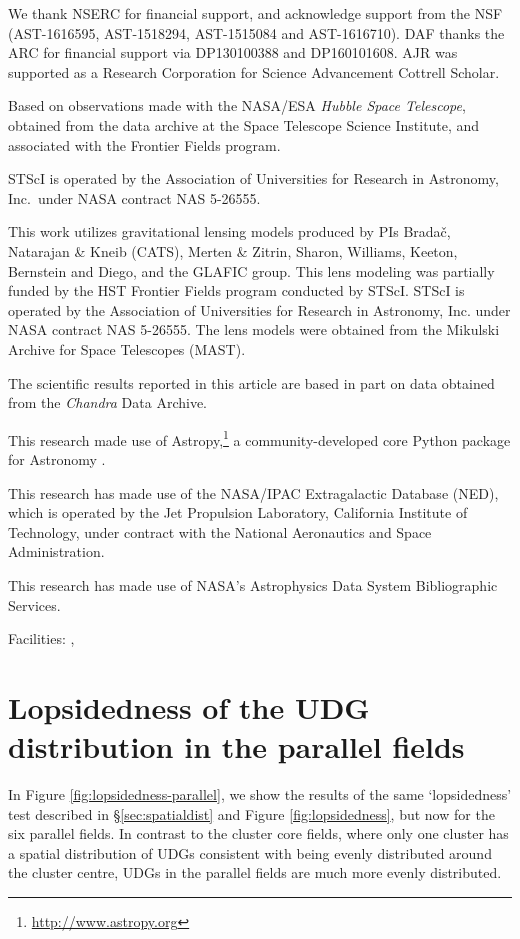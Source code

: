 \documentclass[iop,tighten,twocolumn,apj,floatfix]{emulateapj}
\begin{document}
\acknowledgements

We thank NSERC for financial support, and acknowledge support from the NSF
(AST-1616595, AST-1518294, AST-1515084 and AST-1616710).
DAF thanks the ARC for financial support via DP130100388 and DP160101608. 
AJR was supported as a Research Corporation for Science Advancement Cottrell Scholar.

Based on observations made with the NASA/ESA \textit{Hubble Space Telescope}, obtained
from the data archive at the Space Telescope Science Institute, and associated
with the Frontier Fields program.

STScI is operated by the Association of Universities for Research in
Astronomy, Inc.\ under NASA contract NAS 5-26555.

This work utilizes gravitational lensing models produced by PIs Bradač,
Natarajan \& Kneib (CATS), Merten \& Zitrin, Sharon, Williams, Keeton, Bernstein
and Diego, and the GLAFIC group. This lens modeling was partially funded by
the HST Frontier Fields program conducted by STScI. STScI is operated by the
Association of Universities for Research in Astronomy, Inc. under NASA
contract NAS 5-26555. The lens models were obtained from the Mikulski Archive
for Space Telescopes (MAST).

The scientific results reported in this article are based in part on data
obtained from the \textit{Chandra} Data Archive.

This research made use of Astropy,\footnote{\url{http://www.astropy.org}} a
community-developed core Python package for Astronomy \citep{astropy:2013,
astropy:2018}.

This research has made use of the NASA/IPAC Extragalactic Database (NED),
which is operated by the Jet Propulsion Laboratory, California Institute of
Technology, under contract with the National Aeronautics and Space
Administration.

This research has made use of NASA’s Astrophysics Data System Bibliographic
Services.

Facilities: , 

\appendix

\section{Lopsidedness of the UDG distribution in the parallel fields}
\label{sec:lopsidedness-parallel}

In Figure \ref{fig:lopsidedness-parallel}, we show the results of the same
`lopsidedness' test described in \S \ref{sec:spatialdist} and Figure
\ref{fig:lopsidedness}, but now for the six parallel fields. In contrast to
the cluster core fields, where only one cluster has a spatial distribution of
UDGs consistent with being evenly distributed around the cluster centre, UDGs
in the parallel fields are much more evenly distributed.
\end{document}
